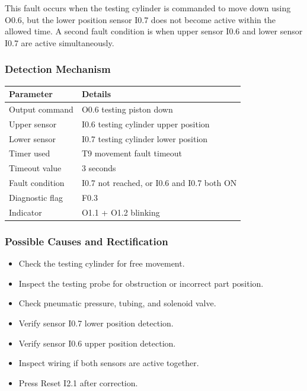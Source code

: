 This fault occurs when the testing cylinder is commanded to move down using O0.6, but the lower position sensor I0.7 does not become active within the allowed time. A second fault condition is when upper sensor I0.6 and lower sensor I0.7 are active simultaneously.

\subsubsection{Detection Mechanism}

\begin{longtable}{|p{3.6cm}|p{9.2cm}|}
\hline
Parameter & Details \\
\hline
Output command & O0.6 testing piston down \\
\hline
Upper sensor & I0.6 testing cylinder upper position \\
\hline
Lower sensor & I0.7 testing cylinder lower position \\
\hline
Timer used & T9 movement fault timeout \\
\hline
Timeout value & 3 seconds \\
\hline
Fault condition & I0.7 not reached, or I0.6 and I0.7 both ON \\
\hline
Diagnostic flag & F0.3 \\
\hline
Indicator & O1.1 + O1.2 blinking \\
\hline
\end{longtable}

\subsubsection{Possible Causes and Rectification}

\begin{itemize}
    \item Check the testing cylinder for free movement.
    \item Inspect the testing probe for obstruction or incorrect part position.
    \item Check pneumatic pressure, tubing, and solenoid valve.
    \item Verify sensor I0.7 lower position detection.
    \item Verify sensor I0.6 upper position detection.
    \item Inspect wiring if both sensors are active together.
    \item Press Reset I2.1 after correction.
\end{itemize}

